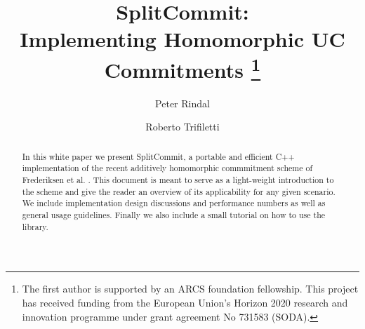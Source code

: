 \documentclass[letterpaper]{llncs}
\begin{document}
	
	\title{SplitCommit:\\ Implementing Homomorphic UC Commitments%
	\thanks{The first author is supported by an ARCS foundation fellowship. This project has received funding from the European Union's Horizon 2020 research and innovation programme under grant agreement No 731583 (SODA).}}
	
	
	\author{
		Peter Rindal \and Roberto Trifiletti
		}

	\date{}

	\maketitle
	

	
	\begin{abstract}
	In this white paper we present SplitCommit, a portable and efficient C++ implementation of the recent additively homomorphic commmitment scheme of Frederiksen et al. \cite{DBLP:conf/tcc/FrederiksenJNT16}. This document is meant to serve as a light-weight introduction to the scheme and give the reader an overview of its applicability for any given scenario. We include implementation design discussions and performance numbers as well as general usage guidelines. Finally we also include a small tutorial on how to use the library.

	\end{abstract}
	
	
	\pagestyle{plain}
	
	
	
	
	

	
	
	
	
	
	
	
	
	
	
\end{document}
